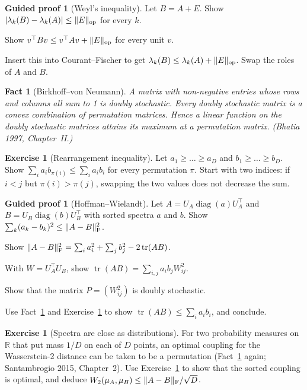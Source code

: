 \documentclass[11pt,a4paper]{article}
\newcommand{\R}{\mathbb{R}}
\DeclareMathOperator{\tr}{tr}
\DeclareMathOperator{\diag}{diag}
\DeclarePairedDelimiter{\norm}{\lVert}{\rVert}
\DeclarePairedDelimiter{\abs}{\lvert}{\rvert}
\newcommand{\op}{\mathrm{op}}
\newcommand{\F}{\mathrm{F}}
\theoremstyle{plain}
\newtheorem{fact}[proposition]{Fact}
\theoremstyle{definition}
\newtheorem{exercise}[proposition]{Exercise}
\newtheorem{guided}[proposition]{Guided proof}
\theoremstyle{remark}
\begin{document}
\begin{guided}[Weyl's inequality]\label{gp:weyl}
Let $B=A+E$. Show $\abs{\lambda_k(B)-\lambda_k(A)}\le\norm{E}_\op$ for every $k$.
\begin{steps}
\item Show $v^\top Bv\le v^\top Av+\norm{E}_\op$ for every unit $v$.
\item Insert this into Courant--Fischer to get $\lambda_k(B)\le\lambda_k(A)+\norm{E}_\op$. Swap the roles of $A$ and
  $B$.
\end{steps}
\end{guided}

\begin{fact}[Birkhoff--von Neumann]\label{fact:birkhoff}
A matrix with non-negative entries whose rows and columns all sum to 1 is \emph{doubly stochastic}. Every doubly
stochastic matrix is a convex combination of permutation matrices. Hence a linear function on the doubly stochastic
matrices attains its maximum at a permutation matrix. (Bhatia 1997, Chapter~II.)
\end{fact}

\begin{exercise}[Rearrangement inequality]\label{ex:rearrange}
Let $a_1\ge\dots\ge a_D$ and $b_1\ge\dots\ge b_D$. Show $\sum_ia_ib_{\pi(i)}\le\sum_ia_ib_i$ for every permutation
$\pi$. Start with two indices: if $i<j$ but $\pi(i)>\pi(j)$, swapping the two values does not decrease the sum.
\end{exercise}

\begin{guided}[Hoffman--Wielandt]\label{gp:hw}
Let $A=U_A\diag(a)U_A^\top$ and $B=U_B\diag(b)U_B^\top$ with sorted spectra $a$ and $b$. Show
$\sum_k(a_k-b_k)^2\le\norm{A-B}_\F^2$.
\begin{steps}
\item Show $\norm{A-B}_\F^2=\sum_ia_i^2+\sum_jb_j^2-2\tr(AB)$.
\item With $W=U_A^\top U_B$, show $\tr(AB)=\sum_{i,j}a_ib_jW_{ij}^2$.
\item Show that the matrix $P=(W_{ij}^2)$ is doubly stochastic.
\item Use Fact~\ref{fact:birkhoff} and Exercise~\ref{ex:rearrange} to show $\tr(AB)\le\sum_ia_ib_i$, and conclude.
\end{steps}
\end{guided}

\begin{exercise}[Spectra are close as distributions]\label{ex:wasserstein}
For two probability measures on $\R$ that put mass $1/D$ on each of $D$ points, an optimal coupling for the
Wasserstein-2 distance can be taken to be a permutation (Fact~\ref{fact:birkhoff} again; Santambrogio 2015,
Chapter~2). Use Exercise~\ref{ex:rearrange} to show that the sorted coupling is optimal, and deduce
$W_2(\mu_A,\mu_B)\le\norm{A-B}_\F/\sqrt D$.
\end{exercise}
\end{document}
